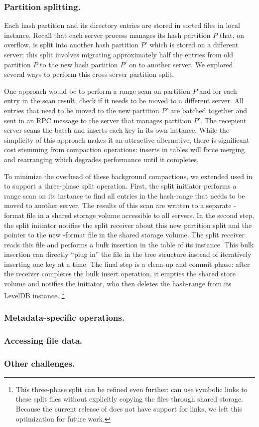 \subsubsection*{Partition splitting.}

Each \giga{} hash partition and its directory entries are stored in sorted \ldb{} 
files in local \tfs{} instance. 
Recall that each \giga{} server process manages its hash partition $P$ that, on 
overflow, is split into another hash partition $P'$ which is stored on a 
different server; this split involves migrating approximately half the entries 
from old partition $P$ to the new hash partition $P'$ on to another server. 
We explored several ways to perform this cross-server partition split.

One approach would be to perform a range scan on partition $P$ and for each
entry in the scan result, check if it needs to be moved to a different server.
All entries that need to be moved to the new partition $P'$ are batched
together and sent in an RPC message to the server that manages partition $P'$.
The recepient server scans the batch and inserts each key in its own \tfs{}
instance. While the simplicity of this approach makes it an attractive
alternative, there is significant cost stemming from \ldb{} compaction
operations: inserts in \ldb{} tables will force merging and rearranging which
degrades performance until it completes.

To minimize the overhead of these background compactions, we extended \ldb{}
used in \tfs{} to support a three-phase split operation. 
First, the split initiator performs a range scan on its \tfs{} instance to find all
entries in the hash-range that needs to be moved to another server. The results
of this scan are written to a separate \ldb{}-format file in a shared storage
volume accessible to all \giga{} servers.
In the second step, the split initiator notifies the split receiver about this new
partition split and the pointer to the new \ldb{}-format file in the shared
storage volume. The split receiver reads this file and performs a bulk
insertion in the \ldb{} table of its \tfs{} instance. This bulk insertion can
directly ``plug in'' the file in the \ldb{} tree structure instead of
iteratively inserting one key at a time.
The final step is a clean-up and commit phase: after the receiver completes the 
bulk insert operation, it empties the shared store volume and notifies the 
initiator, who then deletes the hash-range from its LevelDB instance.
\footnote
{
This three-phase split can be refined even further: \ldb{} can use symbolic links 
to these split files without explicitly copying the files through shared
storage. Because the current release of \ldb{} does not have support for links, we 
left this optimization for future work. 
}

\subsubsection*{Metadata-specific operations.}

\subsubsection*{Accessing file data.}

\subsubsection*{Other challenges.}

